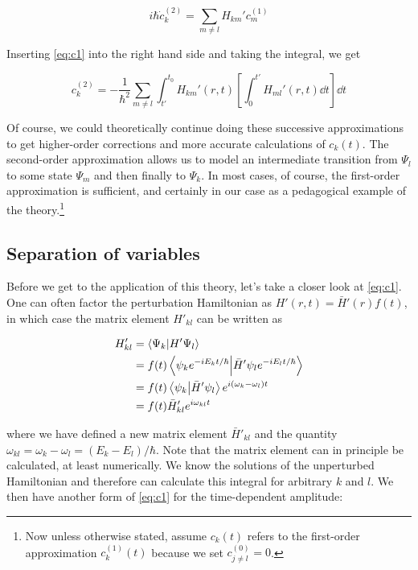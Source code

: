 \begin{equation*}
	i\hbar \dot{c}_k^{(2)} = \sum_{m\neq l} H_{km}'c_m^{(1)}
\end{equation*}

Inserting \autoref{eq:c1} into the right hand side and taking the integral, we get

\begin{equation}
	c_k^{(2)} = -\frac{1}{\hbar^2} \sum_{m\neq l} \int_{t'}^{t_0} H_{km}'(r,t) \left[ \int_{0}^{t'} H_{ml}'(r,t) \dd{t} \right] \dd{t}
\end{equation}

Of course, we could theoretically continue doing these successive approximations to get higher-order corrections and more accurate calculations of $c_k(t)$. 
The second-order approximation allows us to model an intermediate transition from $\Psi_l$ to some state $\Psi_m$ and then finally to $\Psi_k$. 
In most cases, of course, the first-order approximation is sufficient, and certainly in our case as a pedagogical example of the theory.\footnote{Now unless otherwise stated, assume $c_k(t)$ refers to the first-order approximation $c_k^{(1)}(t)$ because we set $c^{(0)}_{j \neq l} = 0$.}


\subsection{Separation of variables}

Before we get to the application of this theory, let's take a closer look at \autoref{eq:c1}. 
One can often factor the perturbation Hamiltonian as $H'(r,t) = \bar{H}'(r)f(t)$, in which case the matrix element $H'_{kl}$ can be written as

\begin{align*}
	H'_{kl} &= \braket{\Psi_k}{H'\Psi_l} \\
	&= f(t) \braket{\psi_ke^{-iE_kt/\hbar}}{\bar{H}'\psi_le^{-iE_lt/\hbar}} \\
	&= f(t) \braket{\psi_k}{\bar{H}'\psi_l}e^{i(\omega_k-\omega_l)t} \\
	&= f(t) \bar{H}'_{kl} e^{i\omega_{kl}t} 
\end{align*}

\noindent where we have defined a new matrix element $\bar{H}'_{kl}$ and the quantity $\omega_{kl} = \omega_k - \omega_l = (E_k - E_l)/\hbar$. 
Note that the matrix element can in principle be calculated, at least numerically. 
We know the solutions of the unperturbed Hamiltonian and therefore can calculate this integral for arbitrary $k$ and $l$. 
We then have another form of \autoref{eq:c1} for the time-dependent amplitude:

